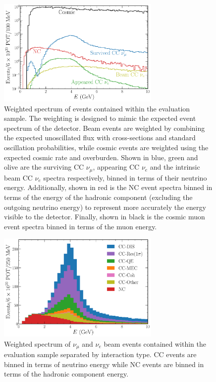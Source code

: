 \begin{figure} %
    \includegraphics[width=0.7\textwidth]{diagrams/6-cvn/chipsnet/explore_osc_fluxes.pdf}
    \caption[Weighted spectrum of evaluation sample events.]
    {Weighted spectrum of events contained within the evaluation sample. The weighting is designed
        to mimic the expected event spectrum of the \chipsfive detector. Beam events are weighted by
        combining the expected unoscillated flux with cross-sections and standard oscillation
        probabilities, while cosmic events are weighted using the expected cosmic rate and overburden.
        Shown in blue, green and olive are the surviving CC $\nu_{\mu}$, appearing CC $\nu_{e}$ and
        the intrinsic beam CC $\nu_{e}$ spectra respectively, binned in terms of their neutrino
        energy. Additionally, shown in red is the NC event spectra binned in terms of the energy of
        the hadronic component (excluding the outgoing neutrino energy) to represent more accurately
        the energy visible to the detector. Finally, shown in black is the cosmic muon event spectra
        binned in terms of the muon energy.}
    \label{fig:explore_osc_fluxes}
\end{figure}

\begin{figure} %
    \includegraphics[width=0.7\textwidth]{diagrams/6-cvn/chipsnet/explore_stacked_int_types.pdf}
    \caption[Weighted spectrum of interaction types within the evaluation sample.]
    {Weighted spectrum of $\nu_{\mu}$ and $\nu_{e}$ beam events contained within the evaluation
        sample separated by interaction type. CC events are binned in terms of neutrino energy while
        NC events are binned in terms of the hadronic component energy.}
    \label{fig:explore_stacked_int_types}
\end{figure}

